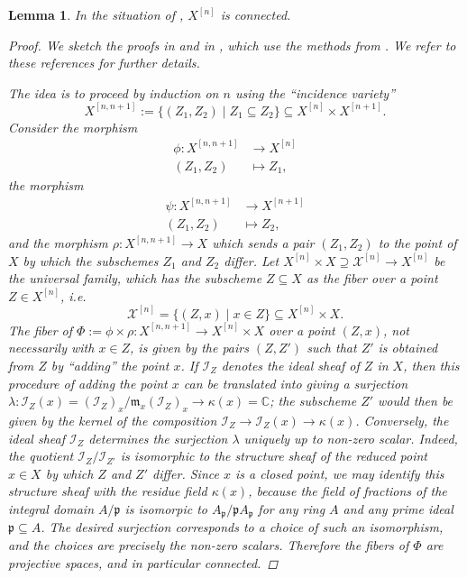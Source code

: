 \documentclass[12pt,a4paper]{amsart}
\theoremstyle{plain}
\newtheorem{lm}[thm]{Lemma}
\theoremstyle{definition}
\theoremstyle{remark}
\begin{document}
\begin{lm}\label{lm:connected}
  In the situation of , $X^{[n]}$ is connected.

  \begin{proof}
    We sketch the proofs in \cite[Example 4.5.10]{hl97} and in \cite[Lemma 3.7]{leh00}, which use the methods from \cite{es98}.
    We refer to these references for further details.

    The idea is to proceed by induction on $n$ using the ``incidence variety''
    \[ X^{[n,n+1]} := \{ (Z_{1}, Z_{2}) \mid Z_{1} \subseteq Z_{2} \} \subseteq X^{[n]} \times X^{[n+1]}. \]
    Consider the morphism
    \begin{align*}
      \phi \colon X^{[n, n+1]} & \longrightarrow X^{[n]} \\
      (Z_{1}, Z_{2}) & \longmapsto Z_{1},
    \end{align*}
    the morphism
    \begin{align*}
      \psi \colon X^{[n, n+1]} & \longrightarrow X^{[n+1]} \\
      (Z_{1}, Z_{2}) & \longmapsto Z_{2},
    \end{align*}
    and the morphism $\rho \colon X^{[n, n+1]} \to X$ which sends a pair $(Z_{1}, Z_{2})$ to the point of $X$ by which the subschemes $Z_{1}$ and $Z_{2}$ differ.
    Let $X^{[n]} \times X \supseteq \mathcal{X}^{[n]} \to X^{[n]}$ be the universal family, which has the subscheme $Z \subseteq X$ as the fiber over a point $Z \in X^{[n]}$, i.e.
    \[ \mathcal{X}^{[n]} = \{ (Z,x) \mid x \in Z \} \subseteq X^{[n]} \times X. \]
    The fiber of $\Phi := \phi \times \rho \colon X^{[n,n+1]} \to X^{[n]} \times X$ over a point $(Z, x)$, not necessarily with $x \in Z$, is given by the pairs $(Z,Z')$ such that $Z'$ is obtained from $Z$ by ``adding'' the point $x$.
    If $\mathscr{I}_{Z}$ denotes the ideal sheaf of $Z$ in $X$, then this procedure of adding the point $x$ can be translated into giving a surjection $\lambda \colon \mathscr{I}_{Z}(x) = (\mathscr{I}_{Z})_{x}/\mathfrak{m}_{x}(\mathscr{I}_{Z})_{x} \to \kappa(x) = \mathbb{C}$; the subscheme $Z'$ would then be given by the kernel of the composition $\mathscr{I}_{Z} \to \mathscr{I}_{Z}(x) \to \kappa(x)$.
    Conversely, the ideal sheaf $\mathscr{I}_{Z}$ determines the surjection $\lambda$ uniquely up to non-zero scalar.
    Indeed, the quotient $\mathscr{I}_{Z}/\mathscr{I}_{Z'}$ is isomorphic to the structure sheaf of the reduced point $x \in X$ by which $Z$ and $Z'$ differ.
    Since $x$ is a closed point, we may identify this structure sheaf with the residue field $\kappa(x)$, because the field of fractions of the integral domain $A/\mathfrak{p}$ is isomorpic to $A_{\mathfrak{p}}/\mathfrak{p}A_{\mathfrak{p}}$ for any ring $A$ and any prime ideal $\mathfrak{p} \subseteq A$.
    The desired surjection corresponds to a choice of such an isomorphism, and the choices are precisely the non-zero scalars.
    Therefore the fibers of $\Phi$ are projective spaces, and in particular connected.


\end{proof}
\end{lm}
\end{document}
